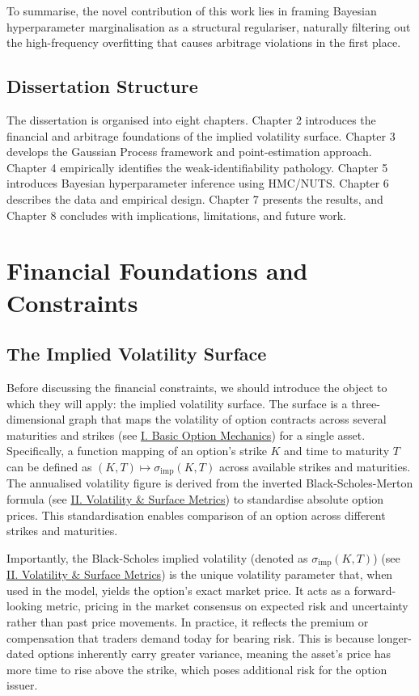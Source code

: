\documentclass[12pt,oneside]{report}
\theoremstyle{definition}
\theoremstyle{remark}
\begin{document}
To summarise, the novel contribution of this work lies in framing Bayesian hyperparameter marginalisation as a structural regulariser, naturally filtering out the high-frequency overfitting that causes arbitrage violations in the first place. 


\section{Dissertation Structure}
The dissertation is organised into eight chapters. Chapter 2 introduces the financial and arbitrage foundations of the implied volatility surface. Chapter 3 develops the Gaussian Process framework and point-estimation approach. Chapter 4 empirically identifies the weak-identifiability pathology. Chapter 5 introduces Bayesian hyperparameter inference using HMC/NUTS. Chapter 6 describes the data and empirical design. Chapter 7 presents the results, and Chapter 8 concludes with implications, limitations, and future work.

\chapter{Financial Foundations and Constraints}
\label{sec:financial_foundations}

\section{The Implied Volatility Surface}
Before discussing the financial constraints, we should introduce the object to which they will apply: the implied volatility surface. The surface is a three-dimensional graph that maps the volatility of option contracts across several maturities and strikes (see \hyperref[sec:glossary_basic_option_definitions]{I. Basic Option Mechanics}) for a single asset. Specifically, a function mapping of an option’s strike $K$ and time to maturity $T$ can be defined as $(K, T) \mapsto \sigma_{\mathrm{imp}}(K,T)$ across available strikes and maturities. The annualised volatility figure is derived from the inverted Black-Scholes-Merton formula (see \hyperref[sec:glossary_volatility_surface_metrics]{II. Volatility \& Surface Metrics}) to standardise absolute option prices. This standardisation enables comparison of an option across different strikes and maturities.

Importantly, the Black-Scholes implied volatility (denoted as $\sigma_{\mathrm{imp}}(K,T)$) (see \hyperref[sec:glossary_volatility_surface_metrics]{II. Volatility \& Surface Metrics}) is the unique volatility parameter that, when used in the \citet{black1973pricing} model, yields the option’s exact market price. It acts as a forward-looking metric, pricing in the market consensus on expected risk and uncertainty rather than past price movements. In practice, it reflects the premium or compensation that traders demand today for bearing risk. This is because longer-dated options inherently carry greater variance, meaning the asset's price has more time to rise above the strike, which poses additional risk for the option issuer.
\end{document}
